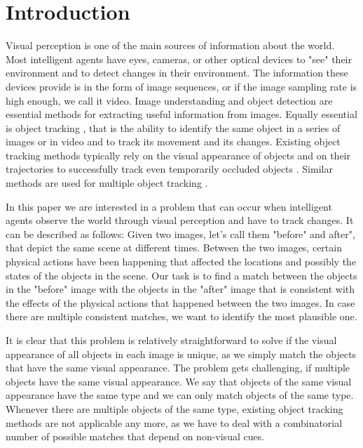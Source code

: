 \documentclass[letterpaper]{article}
\begin{document}
\section{Introduction}

Visual perception is one of the main sources of information about the world. Most intelligent agents have eyes, cameras, or other optical devices to "see" their environment and to detect changes in their environment. The information these devices provide is in the form of image sequences, or if the image sampling rate is high enough, we call it video.
Image understanding \cite{sonka1999image,sridhar2011video} and object detection \cite{papageorgiou1998general} are essential methods for extracting useful information from images. Equally essential is object tracking \cite{yilmaz2006object}, that is the ability to identify the same object in a series of images or in video and to track its movement and its changes. Existing object tracking methods typically rely on the visual appearance of objects and on their trajectories to successfully track even temporarily occluded objects \cite{yilmaz2004contour,cutler2000robust,viola2005detecting}.
Similar methods are used for multiple object tracking \cite{berclaz2011multiple,yang2005fast,han2004algorithm}. 

In this paper we are interested in a problem that can occur when intelligent agents observe the world through visual perception and have to track changes.
It can be described as follows: Given two images, let's call them "before" and after", that depict the same scene at different times. Between the two images, certain physical actions have been happening that affected the locations and possibly the states of the objects in the scene. Our task is to find a match between the objects in the "before" image with the objects in the "after" image that is consistent with the effects of the physical actions that happened between the two images. In case there are multiple consistent matches, we want to identify the most plausible one.

It is clear that this problem is relatively straightforward to solve if the visual appearance of all objects in each image is unique, as we simply match the objects that have the same visual appearance. The problem gets challenging, if multiple objects have the same visual appearance. We say that objects of the same visual appearance have the same type and we can only match objects of the same type. Whenever there are multiple objects of the same type, existing object tracking methods are not applicable any more, as we have to deal with a combinatorial number of possible matches that depend on non-visual cues. 
\end{document}
